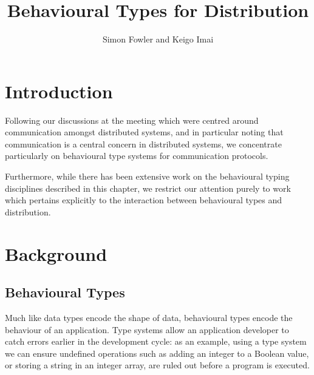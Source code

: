 \documentclass[
graybox,
envcountchap,
]{svmult}
\newcommand{\todo}[1]{{\noindent\small\color{red} \framebox{\parbox{\dimexpr\linewidth-2\fboxsep-2\fboxrule}{\textbf{TODO:} #1}}}}
\begin{document}
\begin{bibunit}

	\title*{Behavioural Types for Distribution}
	\author{Simon Fowler and Keigo Imai}

	\maketitle


  \section{Introduction}


  \todo{yadayada}

  Following our discussions at the meeting which were centred around
  communication amongst distributed systems, and in particular noting that
  communication is a central concern in distributed systems, we concentrate
  particularly on behavioural type systems for communication protocols.

  Furthermore, while there has been extensive work on the behavioural typing
  disciplines described in this chapter, we restrict our attention purely to
  work which pertains explicitly to the interaction between behavioural types
  and distribution.

  \section{Background}
  \subsection{Behavioural Types}

  Much like data types encode the shape of data, behavioural types encode the
  behaviour of an application. Type systems allow an application developer to
  catch errors earlier in the development cycle: as an example, using a type
  system we can ensure undefined operations such as adding an integer to a
  Boolean value, or storing a string in an integer array, are ruled out before a
  program is executed.


\end{bibunit}
\end{document}
